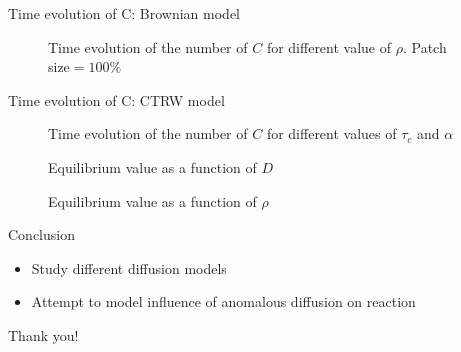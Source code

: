 \documentclass{beamer}
\begin{document}
\begin{frame}
{Time evolution of C: Brownian model}
\begin{figure}
\caption{Time evolution of the number of $C$ for different value of $\rho$. Patch size$=100\%$}
\end{figure}
\end{frame}


\begin{frame}{Time evolution of C: CTRW model}

\begin{figure}
\caption{Time evolution of the number of $C$ for different values of $\tau_c$ and $\alpha$}
\end{figure}
\end{frame}

\begin{frame}
\begin{figure}
\caption{Equilibrium value as a function of $D$}
\end{figure}
\end{frame}



\begin{frame}
\begin{figure}
\caption{Equilibrium value as a function of $\rho$}
\end{figure}
\end{frame}

\begin{frame}
\end{frame}

\begin{frame}{Conclusion}

\begin{itemize}
\itemsep2em
\item Study different diffusion models
\item Attempt to model influence of anomalous diffusion on reaction
\end{itemize}

\end{frame}

\begin{frame}
\begin{center}
\Huge \color{blue} Thank you!
\end{center}
\end{frame}
\end{document}
